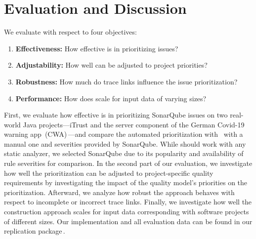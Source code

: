 \section{Evaluation and Discussion}
\label{sec:eval}

We evaluate \appr{} with respect to four objectives:

\begin{enumerate}[label=\textbf{O\arabic*:}, ref=O\arabic*]
    \item \textbf{Effectiveness:}
   		How effective is \appr{} in prioritizing issues?\label{o1}
    \item \textbf{Adjustability:}
    	How well can \appr{} be adjusted to project priorities?\label{o2}
    \item \textbf{Robustness:}
    	How much do trace links influence the issue prioritization?\label{o4}
    \item \textbf{Performance:}
   		How does \appr{} scale for input data of varying sizes?\label{o3}
\end{enumerate}

First, we evaluate how effective \appr{} is in prioritizing SonarQube issues on two real-world Java projects---iTrust and the server component of the German Covid-19 warning app~(CWA)\,\cite{cwa-server}---and compare the automated prioritization with \appr\ with a manual one and severities provided by SonarQube.
While \appr{} should work with any static analyzer, we selected SonarQube due to its popularity and availability of rule severities for comparison.
In the second part of our evaluation, we investigate how well the prioritization can be adjusted to project-specific quality requirements by investigating the impact of the quality model's priorities on the prioritization.
Afterward, we analyze how robust the approach behaves with respect to incomplete or incorrect trace links.
Finally, we investigate how well the construction approach scales for input data corresponding with software projects of different sizes.
Our implementation and all evaluation data can be found in our replication package\,\cite{replication}.

